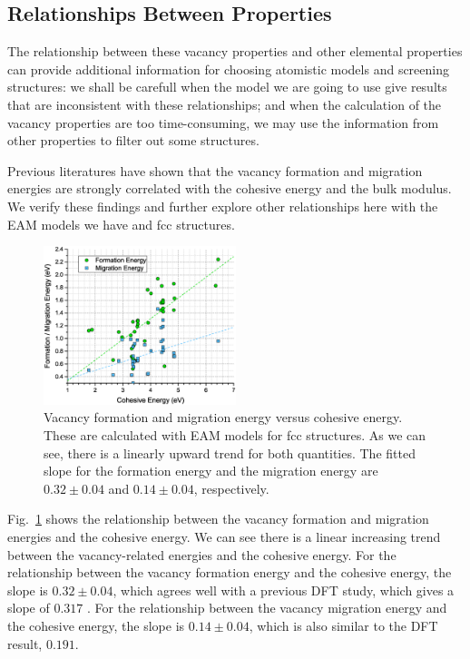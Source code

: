 \documentclass[%
 reprint,
 amsmath,amssymb,
 aps,
]{revtex4-1}
\begin{document}
\subsection{\label{sec:calcvsprop}Relationships Between Properties}

The relationship between these vacancy properties and other elemental properties can provide additional information for choosing atomistic models and screening structures:
we shall be carefull when the model we are going to use give results that are inconsistent with these relationships;
and when the calculation of the vacancy properties are too time-consuming, we may use the information from other properties to filter out some structures.

Previous literatures have shown that the vacancy formation and migration energies are strongly correlated with the cohesive energy and the bulk modulus.
We verify these findings and further explore other relationships here with the EAM models we have and fcc structures.

\begin{figure}
\centering
\includegraphics[width=0.5\textwidth, clip, trim = 10mm 10mm 10mm 10mm]{vfevme_vs_coh}%
\caption{\label{fig:vfevmevscoh}
Vacancy formation and migration energy versus cohesive energy.
These are calculated with EAM models for fcc structures.
As we can see, there is a linearly upward trend for both quantities.
The fitted slope for the formation energy and the migration energy are $0.32\pm0.04$ and $0.14\pm0.04$, respectively.
}
\end{figure}

Fig.~\ref{fig:vfevmevscoh} shows the relationship between the vacancy formation and migration energies and the cohesive energy.
We can see there is a linear increasing trend between the vacancy-related energies and the cohesive energy.
For the relationship between the vacancy formation energy and the cohesive energy, the slope is $0.32\pm0.04$, which agrees well with a previous DFT study, which gives a slope of $0.317$ \cite{angsten2014elemental}.
For the relationship between the vacancy migration energy and the cohesive energy, the slope is $0.14\pm0.04$, which is also similar to the DFT result, $0.191$.
\end{document}
